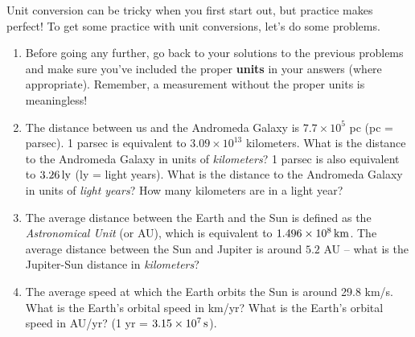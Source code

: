\documentclass[11pt]{article}
\begin{document}
Unit conversion can be tricky when you first start out, but practice makes perfect! To get some practice with unit conversions, let's do some problems.
\begin{enumerate}
    \item Before going any further, go back to your solutions to the previous problems and make sure you've included the proper \textbf{units} in your answers (where appropriate). Remember, a measurement without the proper units is meaningless!
    
    \item The distance between us and the Andromeda Galaxy is $7.7 \times 10^5$ pc (pc = parsec). 1 parsec is equivalent to $3.09 \times 10^{13}$ kilometers. What is the distance to the Andromeda Galaxy in units of \emph{kilometers}? 1 parsec is also equivalent to $3.26 \, {\rm ly}$ (ly = light years). What is the distance to the Andromeda Galaxy in units of \emph{light years}? How many kilometers are in a light year? 
    
    \item The average distance between the Earth and the Sun is defined as the \emph{Astronomical Unit} (or AU), which is equivalent to $1.496 \times 10^8 \, {\rm km}$. The average distance between the Sun and Jupiter is around $5.2$ AU -- what is the Jupiter-Sun distance in \emph{kilometers}?   
    
    \item The average speed at which the Earth orbits the Sun is around 29.8 km/s. What is the Earth's orbital speed in km/yr? What is the Earth's orbital speed in AU/yr? (1 yr = $3.15 \times 10^7 \, {\rm s}$).
    
\end{enumerate}
\bigskip
\end{document}
